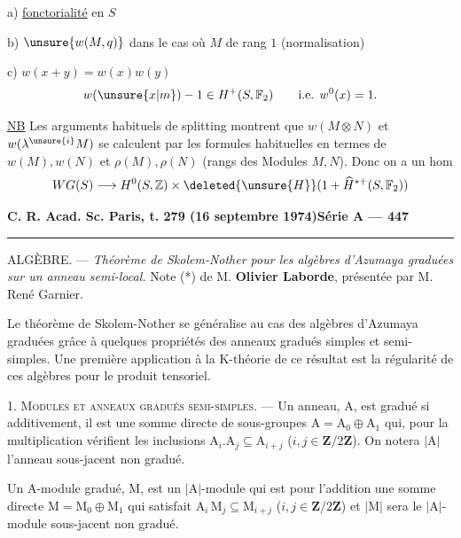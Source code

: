 a) \uline{fonctorialité} en $S$

b) $\unsure{w(M,q)}$ dans le cas où $M$ de rang $1$
(normalisation)

c) $w(x+y)=w(x)w(y)$
\[
w(\unsure{x|m})-1\in H^+(S,\mathbb F_2)\qquad\text{i.e. }w^0(x)=1.
\]



\uline{NB} Les arguments habituels de splitting
montrent que $w(M\otimes N)$ et $w(\lambda^{\unsure{i}}M)$ se
calculent par les formules  habituelles en
termes de $w(M),w(N)$ et $\rho(M),\rho(N)$ (rangs
des Modules $M,N$). Donc on a un \inserted{$\lambda$-}hom
\[
WG(S)\longrightarrow H^0(S,\mathbb Z)\times\deleted{\unsure{H}}(1+\widehat H^{*+}(S,\mathbb F_2))
\]

\textbf{C. R. Acad. Sc. Paris, t. 279 (16 septembre 1974)}\hfill\textbf{Série A — 447}

\rule{\linewidth}{0.4pt}

ALGÈBRE. — \emph{Théorème de Skolem-Nother pour les algèbres d'Azumaya
graduées sur un anneau semi-local.} Note (*) de M. \textbf{Olivier Laborde},
présentée par M. René Garnier.

Le théorème de Skolem-Nother se généralise au cas des algèbres d'Azumaya graduées grâce
à quelques propriétés des anneaux gradués simples et semi-simples. Une première application
à la K-théorie de ce résultat est la régularité de ces algèbres pour le produit tensoriel.

1. \textsc{Modules et anneaux gradués semi-simples}. — Un anneau, A, est gradué si additivement,
il est une somme directe de sous-groupes $\mathrm A=\mathrm A_0\oplus\mathrm A_1$ qui, pour la multiplication
vérifient les inclusions $\mathrm A_i.\mathrm A_j\subseteq\mathrm A_{i+j}$ ($i,j\in\mathbf Z/2\mathbf Z$). On notera $|\mathrm A|$ l'anneau sous-jacent
non gradué.

Un A-module gradué, M, est un $|\mathrm A|$-module qui est pour l'addition une somme directe
$\mathrm M=\mathrm M_0\oplus\mathrm M_1$ qui satisfait $\mathrm A_i\,\mathrm M_j\subseteq\mathrm M_{i+j}$ ($i,j\in\mathbf Z/2\mathbf Z$) et $|\mathrm M|$ sera le $|\mathrm A|$-module
sous-jacent non gradué.

